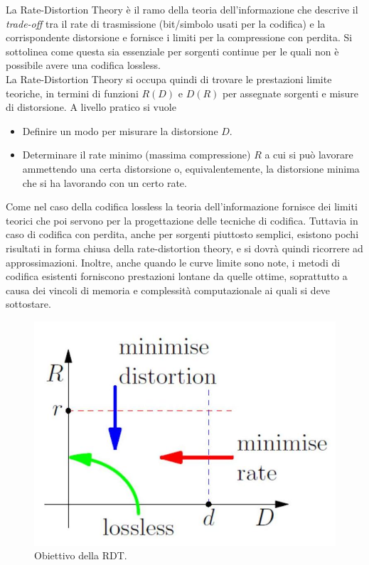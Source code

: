 La Rate-Distortion Theory è il ramo della teoria dell’informazione che descrive il \textit{trade-off} tra il rate di trasmissione (bit/simbolo usati per la codifica) e la corrispondente distorsione e fornisce i limiti per la compressione con perdita. Si sottolinea come questa sia essenziale per sorgenti continue per le quali non \`e possibile avere una codifica lossless. \\
La Rate-Distortion Theory si occupa quindi di trovare le prestazioni limite teoriche, in termini di funzioni $R(D)$ e $D(R)$ per assegnate sorgenti e misure di distorsione.
A livello pratico si vuole
\begin{itemize}
    \item Definire un modo per misurare la distorsione $D$.
    \item Determinare il rate minimo (massima compressione) $R$ a cui si può lavorare ammettendo una certa distorsione o, equivalentemente, la distorsione minima che si ha lavorando con un certo rate.
\end{itemize}
Come nel caso della codifica lossless la teoria dell’informazione fornisce dei limiti teorici che poi servono per
la progettazione delle tecniche di codifica. Tuttavia in caso di codifica con perdita, anche per sorgenti
piuttosto semplici, esistono pochi risultati in forma chiusa della rate-distortion theory, e si dovr\`a quindi ricorrere ad approssimazioni. Inoltre, anche quando le curve limite sono note, i metodi di codifica esistenti forniscono prestazioni lontane da quelle ottime, soprattutto a causa dei vincoli di memoria e complessità computazionale ai quali si deve sottostare.
\begin{figure}[H]
    \centering
    \includegraphics[scale=0.2]{img/rdt.jpg}
    \caption{Obiettivo della RDT.}
    \label{fig:rtd}
\end{figure}

